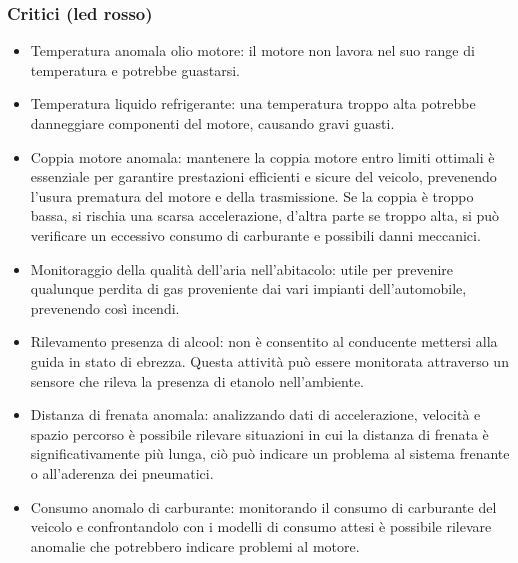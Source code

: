 \documentclass[12pt, a4paper, italian]{report}
\numberwithin{figure}{chapter}
\numberwithin{table}{chapter}
\begin{document}
\subsubsection{Critici (led rosso)}

\begin{itemize}
    \item Temperatura anomala olio motore: il motore non lavora nel suo range di temperatura e potrebbe guastarsi.
    \item Temperatura liquido refrigerante: una temperatura troppo alta potrebbe danneggiare componenti del motore, causando gravi guasti.
    \item Coppia motore anomala: mantenere la coppia motore entro limiti ottimali è essenziale per garantire prestazioni efficienti e sicure del veicolo, prevenendo l'usura prematura del motore e della trasmissione. Se la coppia è troppo bassa, si rischia una scarsa accelerazione, d'altra parte se troppo alta, si può verificare un eccessivo consumo di carburante e possibili danni meccanici.
    \item Monitoraggio della qualità dell'aria nell'abitacolo: utile per prevenire qualunque perdita di gas proveniente dai vari impianti dell'automobile, prevenendo così incendi.
    \item Rilevamento presenza di alcool: non è consentito al conducente mettersi alla guida in stato di ebrezza. Questa attività può essere monitorata attraverso un sensore che rileva la presenza di etanolo nell'ambiente. \cite{ahmar2021road}
    \item Distanza di frenata anomala: analizzando dati di accelerazione, velocità e spazio percorso è possibile rilevare situazioni in cui la distanza di frenata è significativamente più lunga, ciò può indicare un problema al sistema frenante o all'aderenza dei pneumatici.
    \item Consumo anomalo di carburante: monitorando il consumo di carburante del veicolo e confrontandolo con i modelli di consumo attesi è possibile rilevare anomalie che potrebbero indicare problemi al motore.
\end{itemize}
\end{document}
